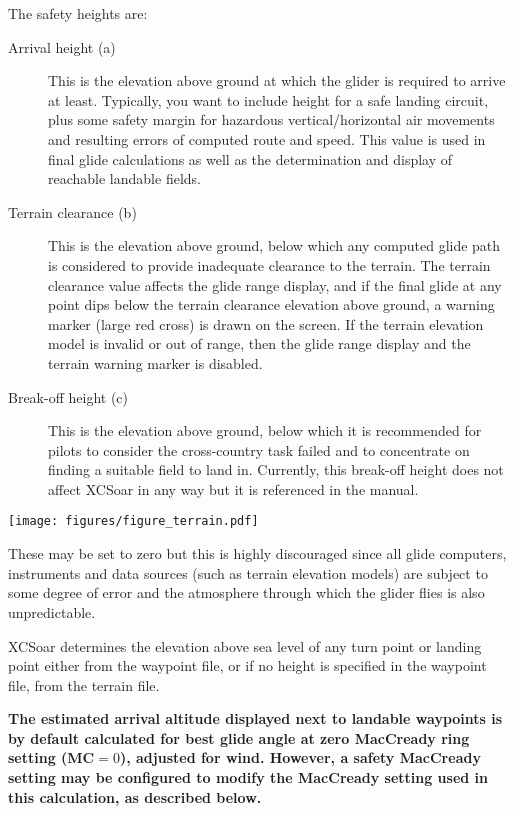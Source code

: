 The safety heights are:
\begin{description}
\item[Arrival height (a)]  This is the elevation above ground at which
 the glider is required to arrive at least.
 Typically, you want to include height for a safe landing circuit, plus
 some safety margin for hazardous vertical/horizontal air movements and
 resulting errors of computed route and speed.
 This value is used in final glide calculations as
 well as the determination and display of reachable landable fields.
\item[Terrain clearance (b)]
 This is the elevation above ground, below which any computed glide
 path is considered to provide inadequate clearance to the terrain.
 The terrain clearance value affects the glide range display, and if
 the final glide at any point dips below the terrain clearance
 elevation above ground, a warning marker (large red cross) is drawn
 on the screen.  If the terrain elevation model is invalid or out of
 range, then the glide range display and the terrain warning marker is
 disabled.
\item[Break-off height (c)]  This is the elevation above ground, below which 
 it is recommended for pilots to consider the cross-country task
 failed and to concentrate on finding a suitable field to land in.
 Currently, this break-off height does not affect XCSoar in any way but
 it is referenced in the manual.
\end{description}

\begin{maxipage}
\begin{center}
\texttt{[image: figures/figure\_terrain.pdf]}
\end{center}
\end{maxipage}

\warning{}
These may be set to zero but this is highly discouraged since all
glide computers, instruments and data sources (such as terrain
elevation models) are subject to some degree of error and the
atmosphere through which the glider flies is also unpredictable.

XCSoar determines the elevation above sea level of any turn point or
landing point either from the waypoint file, or if no height is
specified in the waypoint file, from the terrain file.

\textbf{The estimated arrival altitude displayed next to landable
  waypoints is by default calculated for best glide angle at zero
  MacCready ring setting (MC$=0$), adjusted for wind.  However, a
  safety MacCready setting may be configured to modify the MacCready
  setting used in this calculation, as described below.}

